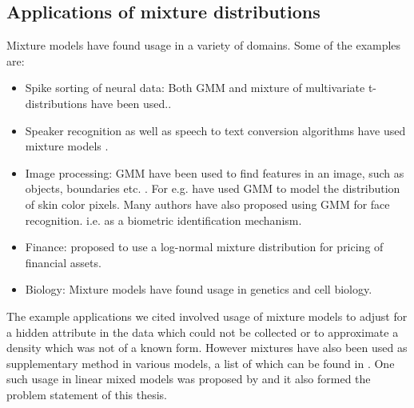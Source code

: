 \subsection{Applications of mixture distributions}
Mixture models have found usage in a variety of domains. Some of the examples are:
\begin{itemize}
\item Spike sorting of neural data: Both GMM and mixture of multivariate t-distributions have been used.\citep{lewicki_bayesian_1994,shoham_robust_2003}.
\item Speaker recognition as well as speech to text conversion algorithms have used mixture models \citep{simancas-acevedo_speaker_2001,xiang_efficient_2003,povey_subspace_2011}.
\item Image processing: GMM have been used to find features in an image, such as objects, boundaries etc. \citep{fu_color_2012}. For e.g. \citet{ming-hsuan_yang_gaussian_1998} have used GMM to model the distribution of skin color pixels. Many authors have also proposed using GMM for face recognition. i.e. as a biometric identification mechanism.
\item Finance: \citet{brigo_lognormal-mixture_2002} proposed to use a log-normal mixture distribution for pricing of financial assets.
\item Biology: Mixture models have found usage in genetics and cell biology.\citep{sim_evaluating_2012,gianola_mixture_2007} 
\end{itemize}

The example applications we cited involved usage of mixture models to adjust for a hidden attribute in the data which could not be collected or to approximate a density which was not of a known form. However mixtures have also been used as supplementary method in various models, a list of which can be found in \citet[pg. 238]{fruhwirth-schnatter_finite_2013}. One such usage in linear mixed models was proposed by \citet{verbeke_linear_1996} and it also formed the problem statement of this thesis.

